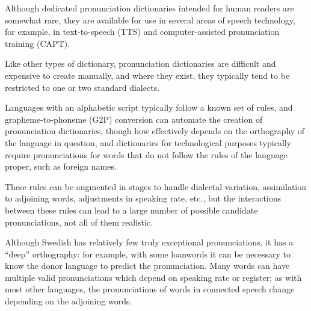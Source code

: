 \documentclass{Interspeech}
\begin{document}


Although dedicated pronunciation dictionaries intended for human readers are somewhat rare, they are available for use in several areas of speech technology, for example, in text-to-speech (TTS) and computer-assisted pronunciation training (CAPT).

Like other types of dictionary, pronunciation dictionaries are difficult and expensive to create manually, and where they exist, they typically tend to be restricted to one or two standard dialects.

Languages with an alphabetic script typically follow a known set of rules, and grapheme-to-phoneme (G2P) conversion can automate the creation of pronunciation dictionaries, though how effectively depends on the orthography of the language in question, and dictionaries for technological purposes typically require pronunciations for words that do not follow the rules of the language proper, such as foreign names.

These rules can be augmented in stages to handle dialectal variation, assimilation to adjoining words, adjustments in speaking rate, etc., but the interactions between these rules can lead to a large number of possible candidate pronunciations, not all of them realistic.

Although Swedish has relatively few truly exceptional pronunciations, it has a ``deep'' orthography: for example, with some loanwords it can be necessary to know the donor language to predict the pronunciation. Many words can have multiple valid pronunciations which depend on speaking rate or register; as with most other languages, the pronunciations of words in connected speech change depending on the adjoining words.
\end{document}
